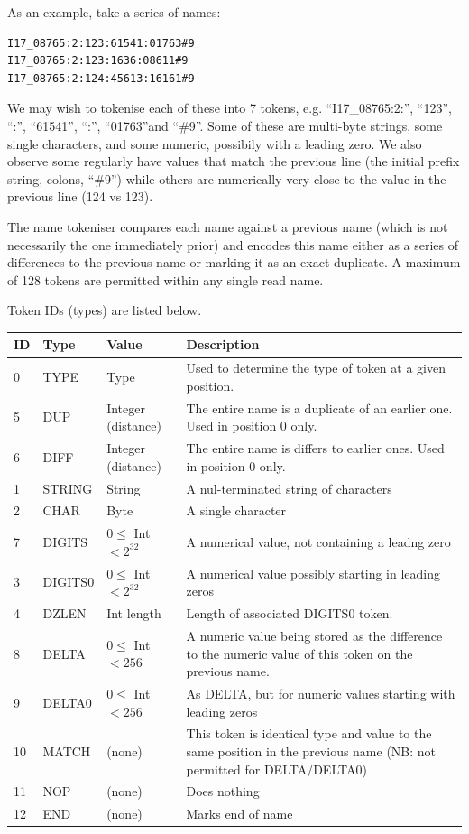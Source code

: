 \documentclass[a4paper]{article}
\begin{document}
As an example, take a series of names:

\begin{verbatim}
I17_08765:2:123:61541:01763#9
I17_08765:2:123:1636:08611#9
I17_08765:2:124:45613:16161#9
\end{verbatim}

We may wish to tokenise each of these into 7 tokens, e.g.
``I17\_08765:2:'', ``123'', ``:'', ``61541'', ``:'', ``01763''and
``\#9''. Some of these are multi-byte strings, some single characters,
and some numeric, possibily with a leading zero.  We also observe some
regularly have values that match the previous line (the initial prefix
string, colons, ``\#9'') while others are numerically very close to the
value in the previous line (124 vs 123).

The name tokeniser compares each name against a previous name (which
is not necessarily the one immediately prior) and encodes this name
either as a series of differences to the previous name or marking it
as an exact duplicate.  A maximum of 128 tokens are permitted within
any single read name.

Token IDs (types) are listed below.

\begin{tabular}{lllp{10cm}}
\hline
\textbf{ID} & \textbf{Type} & \textbf{Value} & \textbf{Description}\\
\hline
 0 & TYPE    & Type    & Used to determine the type of token at a given position. \\
\hline
 5 & DUP     & Integer (distance) & The entire name is a duplicate of an earlier one.  Used in position 0 only.\\
 6 & DIFF    & Integer (distance) & The entire name is differs to earlier ones.  Used in position 0 only.\\
\hline
 1 & STRING  & String  & A nul-terminated string of characters \\
 2 & CHAR    & Byte    & A single character \\
 7 & DIGITS  & $0 \le$ Int $< 2^{32}$ & A numerical value, not containing a leadng zero \\
 3 & DIGITS0 & $0 \le$ Int $< 2^{32}$ & A numerical value possibly starting in leading zeros \\
 4 & DZLEN   & Int length & Length of associated DIGITS0 token.\\
 8 & DELTA  & $0 \le$ Int $< 256$   & A numeric value being stored as the difference to the numeric value of this token on the previous name. \\
 9 & DELTA0 & $0 \le$ Int $< 256$ & As DELTA, but for numeric values starting with leading zeros \\
10 & MATCH   & (none) & This token is identical type and value to the same position in the previous name (NB: not permitted for DELTA/DELTA0)\\
11 & NOP & (none) & Does nothing\\
12 & END     & (none) & Marks end of name\\
\hline
\end{tabular}
\end{document}
